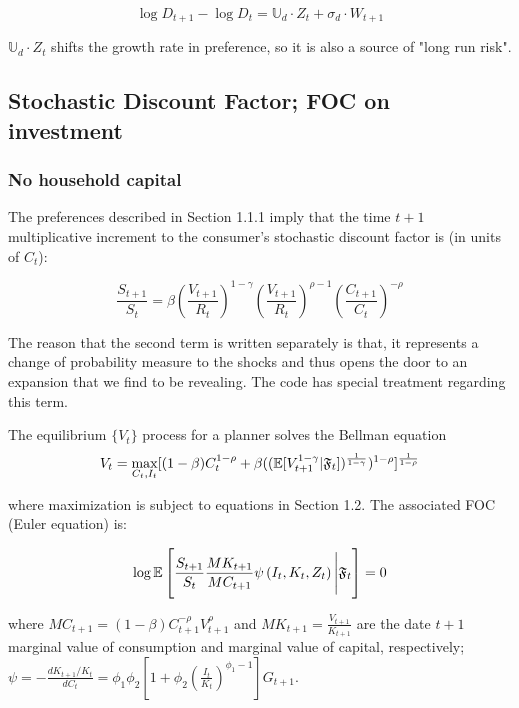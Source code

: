 \documentclass{article}
\theoremstyle{exampstyle}
\begin{document}
\begin{equation*}
    \log D_{t+1} - \log D_t = \mathbb{U}_d \cdot Z_t + \sigma_d \cdot W_{t+1}
\end{equation*}

$\mathbb{U}_d \cdot Z_t$ shifts the growth rate in preference, so it is also a source of "long run risk".

\subsection{Stochastic Discount Factor; FOC on investment}
\subsubsection{No household capital}
The preferences described in Section 1.1.1 imply that the time $t+1$ multiplicative increment to the consumer's stochastic discount factor is (in units of $C_t$):

\begin{equation*}
\frac{S_{t+1}}{S_t} = \beta \left(\frac{V_{t+1}}{R_t}\right)^{1-\gamma} \left(\frac{V_{t+1}}{R_t}\right)^{\rho-1} \left(\frac{C_{t+1}}{C_t}\right)^{-\rho}
\end{equation*} 

The reason that the second term is written separately is that, it represents a change of probability measure to the shocks and thus opens the door to an expansion that we find to be revealing. The code has special treatment regarding this term.

The equilibrium $\{V_t\}$ process for a planner solves the Bellman equation
\begin{equation}\notag
V_t = \max_{C_t, I_t}[(1-\beta)C_t^{1-\rho} + \beta((\mathbb{E}[V_{t+1}^{1-\gamma}| \mathfrak{F}_t])^{\frac{1}{1-\gamma}})^{1-\rho}]^{\frac{1}{1-\rho}}
\end{equation}

where maximization is subject to equations in Section 1.2. The associated FOC (Euler equation) is:

\begin{equation}\notag
\log \mathbb{E}\left[\frac{S_{t+1}}{S_t}\frac{MK_{t+1}}{MC_{t+1}}\psi \left(I_t, K_t, Z_t\right) \Biggl| {\mathfrak F}_t \right] = 0 
\end{equation}

where $MC_{t+1} = (1-\beta)C_{t+1}^{-\rho}V_{t+1}^\rho$ and $MK_{t+1} = \frac{V_{t+1}}{K_{t+1}}$ are the date $t+1$ marginal value of consumption and marginal value of capital, respectively; $\psi = - \frac{dK_{t+1}/K_t}{dC_t} = \phi_1 \phi_2 [1+\phi_2 (\frac{I_t}{K_t})^{\phi_1-1}]G_{t+1}$.
\end{document}

